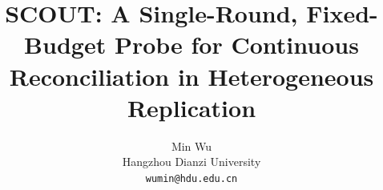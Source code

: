 \documentclass[letterpaper,twocolumn,10pt]{article}
\begin{document}
\date{}


\title{SCOUT: A Single-Round, Fixed-Budget Probe for Continuous Reconciliation in Heterogeneous Replication}

\author{
{\rm Min Wu}\\
Hangzhou Dianzi University\\
\texttt{wumin@hdu.edu.cn}
}

\maketitle

\thispagestyle{empty}

















\end{document}
